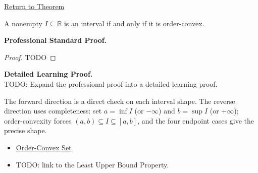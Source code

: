 \newpage
{}
\label{prf:interval-iff-order-convex}

\begin{remark*}[Return]
\hyperref[thm:interval-iff-order-convex]{Return to Theorem}
\end{remark*}

\begin{theorem*}
A nonempty $I\subseteq\mathbb{R}$ is an interval if and only if it is order-convex.
\end{theorem*}

\textbf{Professional Standard Proof.}~\\
\begin{proof}
TODO
\end{proof}

\textbf{Detailed Learning Proof.}~\\
TODO: Expand the professional proof into a detailed learning proof.

\begin{remark*}
The forward direction is a direct check on each interval shape. The reverse direction uses completeness: set $a=\inf I$ (or $-\infty$) and $b=\sup I$ (or $+\infty$); order-convexity forces $(a,b)\subseteq I\subseteq[a,b]$, and the four endpoint cases give the precise shape.
\end{remark*}

\begin{dependencies}
\begin{itemize}
  \item \hyperref[def:order-convex-set]{Order-Convex Set}
  \item TODO: link to the Least Upper Bound Property.
\end{itemize}
\end{dependencies}

